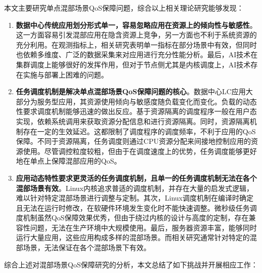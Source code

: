 本文主要研究单点混部场景QoS保障问题，综合以上相关理论研究能够发现：

\begin{enumerate}

    \item \textbf{数据中心传统应用划分形式单一，容易忽略应用在资源上的倾向性与敏感性}。这一方面容易引发混部应用在隐含资源上竞争，另一方面也不利于系统资源的充分利用。在观测指标上，相关研究表明单一指标在部分场景中有效，但同时也依赖多维度、广泛的数据采集来对应用进行充分性能分析。最后，AI技术在集群调度上能够很好的发挥作用，但对于节点侧尤其是内核调度上，AI技术存在实施与部署上困难的问题。
    
    \item \textbf{任务调度机制是解决单点混部场景QoS保障问题的核心}。数据中心LC应用大部分为服务型应用，其资源使用倾向与敏感度随负载变化而变化。负载的动态性要求调度机制能够迅速的做出反应。基于资源隔离的调度程序一般在用户态实现，依赖系统调用来获取资源分配信息和进行资源隔离。同时，资源隔离机制存在一定的生效延迟。这都限制了调度程序的调度频率，不利于应用的QoS保障。不同于资源隔离，任务调度则通过CPU资源分配来间接地控制应用的资源使用。尽管调控粒度较粗，但由于在调度速度上的优势，任务调度能够更好地在单点上保障混部应用的QoS。
    
    \item \textbf{应用动态特性要求更灵活的任务调度机制，且单一的任务调度机制无法在各个混部场景有效}。Linux内核追求普适的调度机制，并存在大量的启发式逻辑，难以针对特定混部场景进行调整与定制。其次，Linux调度机制在编译时确定且无法在运行时修改，在软硬件环境发生变化时不能快速调整。微秒级任务调度机制虽然QoS保障效果优秀，但由于绕过内核的设计与高度的定制，存在兼容性问题，无法在生产环境中大规模使用。最后，服务器资源丰富，能够同时运行大量应用，这些应用构成多样的混部场景。而相关研究通常针对特定的混部场景，无法保证在各个混部场景下有效。

\end{enumerate}

综合上述对混部场景QoS保障研究的分析，本文总结了如下挑战并开展相应工作：

